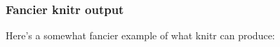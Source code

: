 \documentclass{beamer}
\begin{document}
\begin{frame}
  \frametitle{Fancier knitr output}

Here's a somewhat fancier example of what knitr can produce:

\begin{center}
\end{center}


\end{frame}
\end{document}

